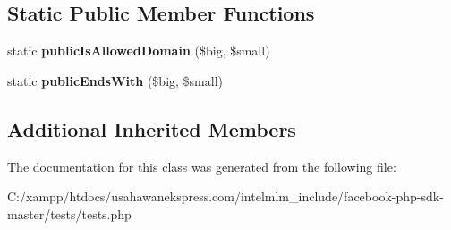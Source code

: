 \subsection*{Static Public Member Functions}
\begin{DoxyCompactItemize}
\item 
\hypertarget{class_persistent_f_b_public_af2ae4ca69b99f04de5e99577b6599965}{static {\bfseries public\-Is\-Allowed\-Domain} (\$big, \$small)}\label{class_persistent_f_b_public_af2ae4ca69b99f04de5e99577b6599965}

\item 
\hypertarget{class_persistent_f_b_public_ab0822b1e897434e5325fbc7897d6e970}{static {\bfseries public\-Ends\-With} (\$big, \$small)}\label{class_persistent_f_b_public_ab0822b1e897434e5325fbc7897d6e970}

\end{DoxyCompactItemize}
\subsection*{Additional Inherited Members}


The documentation for this class was generated from the following file\-:\begin{DoxyCompactItemize}
\item 
C\-:/xampp/htdocs/usahawanekspress.\-com/intelmlm\-\_\-include/facebook-\/php-\/sdk-\/master/tests/tests.\-php\end{DoxyCompactItemize}
